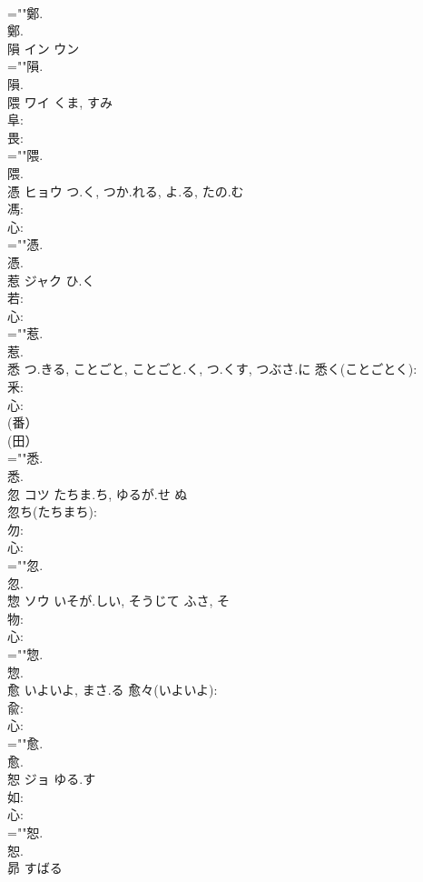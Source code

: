 \documentclass[8pt]{extreport}
\begin{document}
\begin{CJK}{UTF8}{min}
\\	=""鄭.
\\	鄭.
\\	隕	イン ウン			
\\	=""隕.
\\	隕.
\\	隈	ワイ	くま, すみ		
\\	阜: 
\\	畏: 
\\	=""隈.
\\	隈.
\\	憑	ヒョウ	つ.く, つか.れる, よ.る, たの.む		
\\	馮: 
\\	心: 
\\	=""憑.
\\	憑.
\\	惹	ジャク	ひ.く		
\\	若: 
\\	心: 
\\	=""惹.
\\	惹.
\\	悉		つ.きる, ことごと, ことごと.く, つ.くす, つぶさ.に			悉く(ことごとく): 
\\	釆: 
\\	心: 
\\	(番）
\\	(田） 
\\	=""悉.
\\	悉.
\\	忽	コツ	たちま.ち, ゆるが.せ	ぬ	
\\	忽ち(たちまち): 
\\	勿: 
\\	心: 
\\	=""忽.
\\	忽.
\\	惣	ソウ	いそが.しい, そうじて	ふさ, そ	
\\	物: 
\\	心: 
\\	=""惣.
\\	惣.
\\	愈		いよいよ, まさ.る			愈々(いよいよ): 
\\	兪: 
\\	心: 
\\	=""愈.
\\	愈.
\\	恕	ジョ	ゆる.す		
\\	如: 
\\	心: 
\\	=""恕.
\\	恕.
\\	昴		すばる				

\end{CJK}
\end{document}
